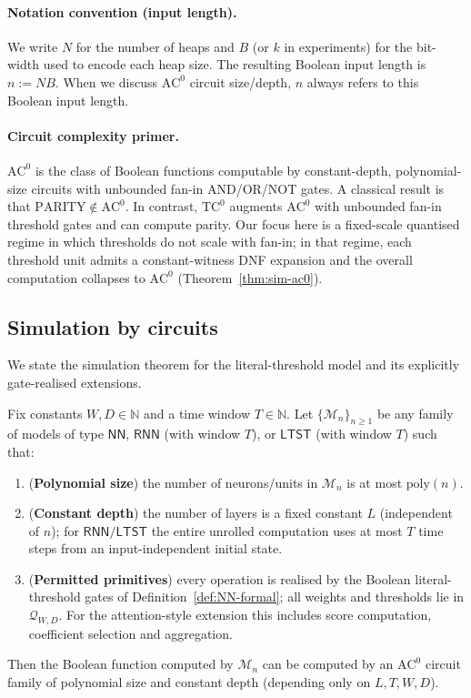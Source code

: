 \documentclass[twoside,11pt]{article}
\newcommand{\AC}{\mathrm{AC}}
\newcommand{\TC}{\mathrm{TC}}
\newcommand{\poly}{\mathrm{poly}}
\newcommand{\NN}{\mathsf{NN}}
\newcommand{\RNN}{\mathsf{RNN}}
\newcommand{\LTST}{\mathsf{LTST}}
\newcommand{\N}{\mathbb{N}}
\newcommand{\Qset}{\mathcal{Q}}
\numberwithin{theorem}{section}
\numberwithin{equation}{section}
\begin{document}
\paragraph{Notation convention (input length).}
We write $N$ for the number of heaps and $B$ (or $k$ in experiments) for the bit-width used to encode each heap size. The resulting Boolean input length is $n := NB$. When we discuss $\AC^0$ circuit size/depth, $n$ always refers to this Boolean input length.

\paragraph{Circuit complexity primer.}
$\AC^0$ is the class of Boolean functions computable by constant-depth, polynomial-size circuits with unbounded fan-in AND/OR/NOT gates. A classical result is that $\mathrm{PARITY}\notin\AC^0$. In contrast, $\TC^0$ augments $\AC^0$ with unbounded fan-in threshold gates and can compute parity. Our focus here is a fixed-scale quantised regime in which thresholds do not scale with fan-in; in that regime, each threshold unit admits a constant-witness DNF expansion and the overall computation collapses to $\AC^0$ (Theorem~\ref{thm:sim-ac0}).

\subsection{Simulation by circuits}
\label{sec:simulation}

We state the simulation theorem for the literal-threshold model and its explicitly gate-realised extensions.

\begin{theorem}[Simulation by $\AC^0$]
\label{thm:sim-ac0}
Fix constants $W,D\in\N$ and a time window $T\in\N$.
Let $\{\mathcal{M}_n\}_{n\ge 1}$ be any family of models of type $\NN$, $\RNN$ (with window $T$), or $\LTST$ (with window $T$) such that:
\begin{enumerate}[leftmargin=*,label=(\arabic*)]
\item (\textbf{Polynomial size}) the number of neurons/units in $\mathcal{M}_n$ is at most $\poly(n)$.
\item (\textbf{Constant depth}) the number of layers is a fixed constant $L$ (independent of $n$); for $\RNN/\LTST$ the entire unrolled computation uses at most $T$ time steps from an input-independent initial state.
\item (\textbf{Permitted primitives}) every operation is realised by the Boolean literal-threshold gates of Definition~\ref{def:NN-formal}; all weights and thresholds lie in $\Qset_{W,D}$. For the attention-style extension this includes score computation, coefficient selection and aggregation.
\end{enumerate}
Then the Boolean function computed by $\mathcal{M}_n$ can be computed by an $\AC^0$ circuit family of polynomial size and constant depth (depending only on $L,T,W,D$).
\end{theorem}
\end{document}
